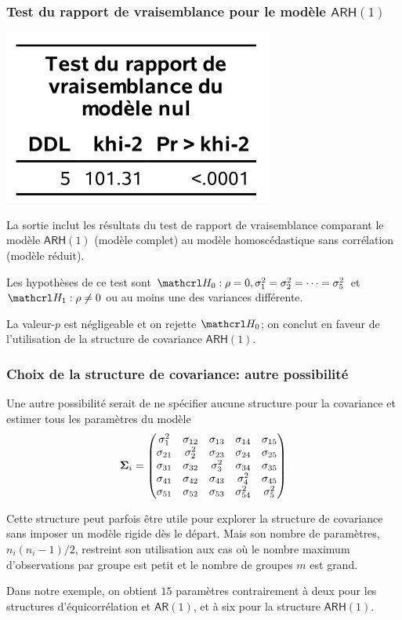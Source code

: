 \documentclass{beamer}
\begin{document}
\begin{frame}[fragile]
\frametitle{Test du rapport de vraisemblance pour le modèle $\mathsf{ARH}(1)$}
\begin{center}
\includegraphics[width = 0.35\linewidth]{img/c5/diapos6-e20}
\end{center}
\bi
\item La sortie \SASlang{} inclut les résultats du test de rapport de vraisemblance comparant le modèle $\mathsf{ARH}(1)$ (modèle complet) au modèle homoscédastique sans corrélation (modèle réduit).
\item Les hypothèses de ce test sont $\Hy_0: \rho=0, \sigma_1^2=\sigma_2^2=\cdots=\sigma_5^2$ et  $\Hy_1: \rho \neq 0$ ou au moins une des variances différente.
\item La valeur-$p$ est négligeable et on rejette $\Hy_0$; on conclut en faveur de l'utilisation de la structure de covariance $\mathsf{ARH}(1)$.
\ei
\end{frame}

\begin{frame}[fragile]
\frametitle{Choix de la structure de covariance: autre possibilité}
\bi
\item Une autre possibilité serait de ne spécifier aucune structure pour la covariance et estimer tous les paramètres du modèle
\[
\boldsymbol {\Sigma}_i=
  \begin{pmatrix}
  \sigma^2_1 & \sigma_{12} & \sigma_{13} & \sigma_{14} & \sigma_{15} \\
   \sigma_{21} & \sigma_2^2  & \sigma_{23} & \sigma_{24} & \sigma_{25}\\
  \sigma_{31} & \sigma_{32} & \sigma^2_3 & \sigma_{34} & \sigma_{35}\\
   \sigma_{41} & \sigma_{42} & \sigma_{43} & \sigma_{4}^2 & \sigma_{45}\\
    \sigma_{51} & \sigma_{52} & \sigma_{53} & \sigma_{54}^2 & \sigma_{5}^2\\
    \end{pmatrix}
\]

\item Cette structure peut parfois être utile pour explorer la structure de covariance
sans imposer un modèle rigide dès le départ. Mais son nombre de paramètres, $n_i(n_i-1)/2$, restreint son utilisation aux cas où le nombre maximum d'observations par groupe est petit et le nombre de groupes $m$ est grand.
\item Dans notre exemple, on obtient $15$ paramètres contrairement à deux pour les structures d'équicorrélation et $\mathsf{AR}(1)$, et à
six pour la structure $\mathsf{ARH}(1)$. 
\ei
\end{frame}
\end{document}
